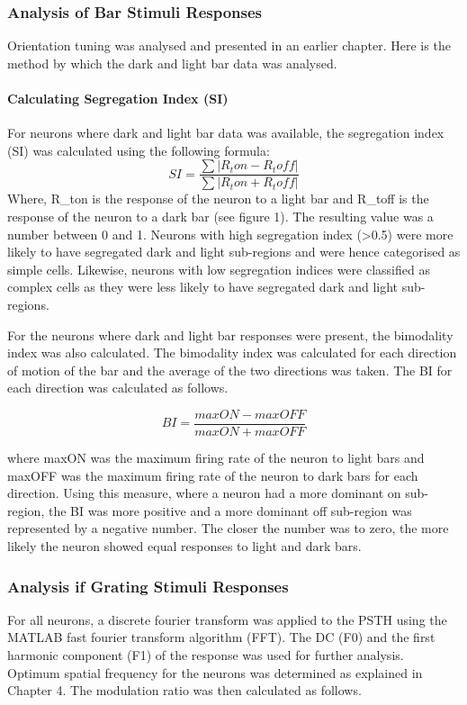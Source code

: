 				\subsubsection{Analysis of Bar Stimuli Responses}
				Orientation tuning was analysed and presented in an earlier chapter. Here is the method by which the dark and light bar data was analysed.
					\paragraph{Calculating Segregation Index (SI)}
					For neurons where dark and light bar data was available, the segregation index (SI) was calculated using the following formula: 
					\[SI=\frac{\sum|R_ton-R_toff|}{\sum|R_ton+R_toff|}\]
					Where, R\_ton is the response of the neuron to a light bar and R\_toff is the response of the neuron to a dark bar (see figure 1). The resulting value was a number between 0 and 1. Neurons with high segregation index (>0.5) were more likely to have segregated dark and light sub-regions and were hence categorised as simple cells. Likewise, neurons with low segregation indices were classified as complex cells as they were less likely to have segregated dark and light sub-regions.
					
					For the neurons where dark and light bar responses were present, the bimodality index was also calculated. The bimodality index was calculated for each direction of motion of the bar and the average of the two directions was taken. The BI for each direction was calculated as follows.
					
					\[BI=\frac{maxON-maxOFF}{maxON+maxOFF}\]
					
					where maxON was the maximum firing rate of the neuron to light bars and maxOFF was the maximum firing rate of the neuron to dark bars for each direction. Using this measure, where a neuron had a more dominant on sub-region, the BI was more positive and a more dominant off sub-region was represented by a negative number. The closer the number was to zero, the more likely the neuron showed equal responses to light and dark bars.
				
				\subsubsection{Analysis if Grating Stimuli Responses}
				
				For all neurons, a discrete fourier transform was applied to the PSTH using the MATLAB fast fourier transform algorithm (FFT). The DC (F0) and the first harmonic component (F1) of the response was used for further analysis. Optimum spatial frequency for the neurons was determined as explained in Chapter 4. The modulation ratio was then calculated as follows.
				
